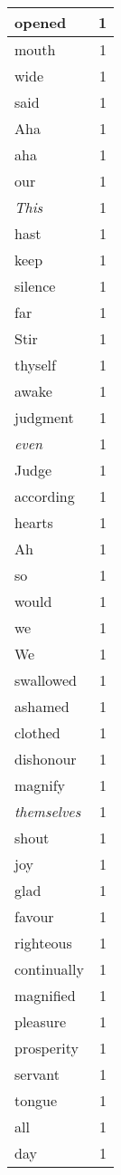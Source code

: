 \begin{center}
\begin{longtable}{l|r}
opened & 1 \\ \hline
mouth & 1 \\ \hline
wide & 1 \\ \hline
said & 1 \\ \hline
Aha & 1 \\ \hline
aha & 1 \\ \hline
our & 1 \\ \hline
\emph{This} & 1 \\ \hline
hast & 1 \\ \hline
keep & 1 \\ \hline
silence & 1 \\ \hline
far & 1 \\ \hline
Stir & 1 \\ \hline
thyself & 1 \\ \hline
awake & 1 \\ \hline
judgment & 1 \\ \hline
\emph{even} & 1 \\ \hline
Judge & 1 \\ \hline
according & 1 \\ \hline
hearts & 1 \\ \hline
Ah & 1 \\ \hline
so & 1 \\ \hline
would & 1 \\ \hline
we & 1 \\ \hline
We & 1 \\ \hline
swallowed & 1 \\ \hline
ashamed & 1 \\ \hline
clothed & 1 \\ \hline
dishonour & 1 \\ \hline
magnify & 1 \\ \hline
\emph{themselves} & 1 \\ \hline
shout & 1 \\ \hline
joy & 1 \\ \hline
glad & 1 \\ \hline
favour & 1 \\ \hline
righteous & 1 \\ \hline
continually & 1 \\ \hline
magnified & 1 \\ \hline
pleasure & 1 \\ \hline
prosperity & 1 \\ \hline
servant & 1 \\ \hline
tongue & 1 \\ \hline
all & 1 \\ \hline
day & 1 \\ \hline
\end{longtable}
\end{center}



